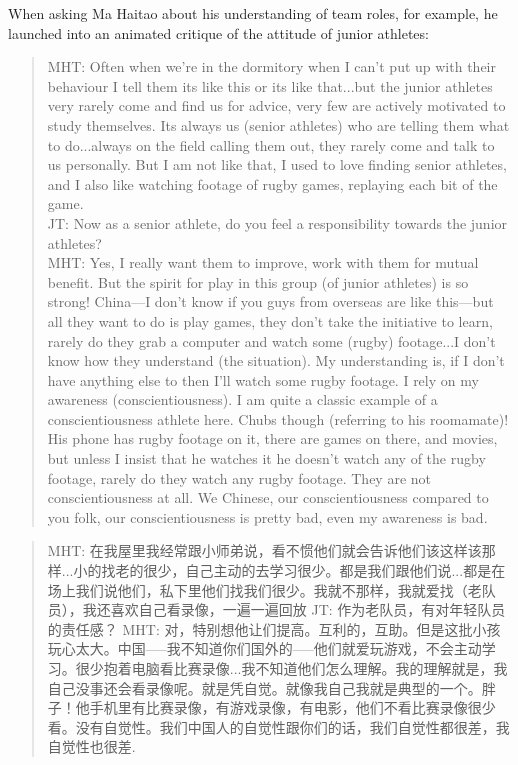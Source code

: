 \begin{CJK}{UTF8}{gbsn}
When asking Ma Haitao about his understanding of team roles, for example, he launched into an animated critique of the attitude of junior athletes:


  \begin{quotation}
    MHT: Often when we're in the dormitory when I can't put up with their behaviour I tell them its like this or its like that...but the junior athletes very rarely come and find us for advice, very few are actively motivated to study themselves. Its always us (senior athletes) who are telling them what to do...always on the field calling them out, they rarely come and talk to us personally.  But I am not like that, I used to love finding senior athletes, and I also like watching footage of rugby games, replaying each bit of the game.\\
    JT: Now as a senior athlete, do you feel a responsibility towards the junior athletes?\\
    MHT: Yes, I really want them to improve, work with them for mutual benefit.  But the spirit for play in this group (of junior athletes) is so strong!  China---I don't know if you guys from overseas are like this---but all they want to do is play games, they don't take the initiative to learn, rarely do they grab a computer and watch some (rugby) footage...I don’t know how they understand (the situation).  My understanding is, if I don’t have anything else to then I’ll watch some rugby footage. I rely on my awareness (conscientiousness).  I am quite a classic example of a conscientiousness athlete here.  Chubs though (referring to his roomamate)!  His phone has rugby footage on it, there are games on there, and movies, but unless I insist that he watches it he doesn't watch any of the rugby footage, rarely do they watch any rugby footage.  They are not conscientiousness at all. We Chinese, our conscientiousness compared to you folk, our conscientiousness is pretty bad, even my awareness is bad.
  \end{quotation}

  \begin{quotation}
    MHT: 在我屋里我经常跟小师弟说，看不惯他们就会告诉他们该这样该那样...小的找老的很少，自己主动的去学习很少。都是我们跟他们说...都是在场上我们说他们，私下里他们找我们很少。我就不那样，我就爱找（老队员），我还喜欢自己看录像，一遍一遍回放
    JT: 作为老队员，有对年轻队员的责任感？
    MHT: 对，特别想他让们提高。互利的，互助。但是这批小孩玩心太大。中国—--我不知道你们国外的—--他们就爱玩游戏，不会主动学习。很少抱着电脑看比赛录像...我不知道他们怎么理解。我的理解就是，我自己没事还会看录像呢。就是凭自觉。就像我自己我就是典型的一个。胖子！他手机里有比赛录像，有游戏录像，有电影，他们不看比赛录像很少看。没有自觉性。我们中国人的自觉性跟你们的话，我们自觉性都很差，我自觉性也很差.
  \end{quotation}




\end{CJK}

